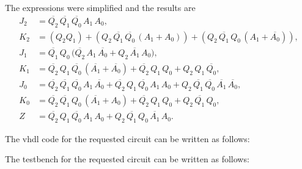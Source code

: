 \documentclass[table ]{article}
\begin{document}
    
The expressions were simplified and the results are
\[
\begin{aligned}
J_{2} &= \overline{Q_{2}}\,\overline{Q_{1}}\,\overline{Q_{0}}\,A_{1}\,A_{0},\\
K_{2} &= (Q_{2}Q_{1}) + (Q_{2}\,\overline{Q_{1}}\,\overline{Q_{0}}\,(A_{1}+A_{0})) + (Q_{2}\,\overline{Q_{1}}\,Q_{0}\,(A_{1}+\overline{A_{0}})),\\
J_{1} &= \overline{Q_{1}}\,Q_{0}\,\bigl(\overline{Q_{2}}\,A_{1}\,\overline{A_{0}} + Q_{2}\,\overline{A_{1}}\,A_{0}\bigr),\\
K_{1} &= \overline{Q_{2}}\,Q_{1}\,\overline{Q_{0}}\,(\overline{A_{1}}+\overline{A_{0}}) + \overline{Q_{2}}\,Q_{1}\,Q_{0} + Q_{2}\,Q_{1}\,\overline{Q_{0}},\\
J_{0} &= \overline{Q_{2}}\,\overline{Q_{1}}\,\overline{Q_{0}}\,A_{1}\,\overline{A_{0}} + \overline{Q_{2}}\,Q_{1}\,\overline{Q_{0}}\,A_{1}\,A_{0} + Q_{2}\,\overline{Q_{1}}\,\overline{Q_{0}}\,\overline{A_{1}}\,\overline{A_{0}},\\
K_{0} &= \overline{Q_{2}}\,\overline{Q_{1}}\,Q_{0}\,(\overline{A_{1}}+A_{0}) + \overline{Q_{2}}\,Q_{1}\,Q_{0} + Q_{2}\,\overline{Q_{1}}\,Q_{0},\\
Z &= \overline{Q_{2}}\,Q_{1}\,\overline{Q_{0}}\,A_{1}\,A_{0} + Q_{2}\,\overline{Q_{1}}\,Q_{0}\,\overline{A_{1}}\,A_{0}.
\end{aligned}
\]

The vhdl code for the requested circuit can be written as follows:


\begin{center} %
    \lstset{
  caption= Pattern\_Detector\_JK\_FF.vhd, 
  basicstyle=\footnotesize, frame=tb,
  xleftmargin=.2\textwidth, xrightmargin=.2\textwidth
}
    

\end{center}

The testbench for the requested circuit can be written as follows:


\begin{center} %
    \lstset{
  caption= Pattern\_Detector\_JK\_FF\_tb.vhd, 
  basicstyle=\footnotesize, frame=tb,
  xleftmargin=.2\textwidth, xrightmargin=.2\textwidth
}
    

\end{center}
\end{document}
